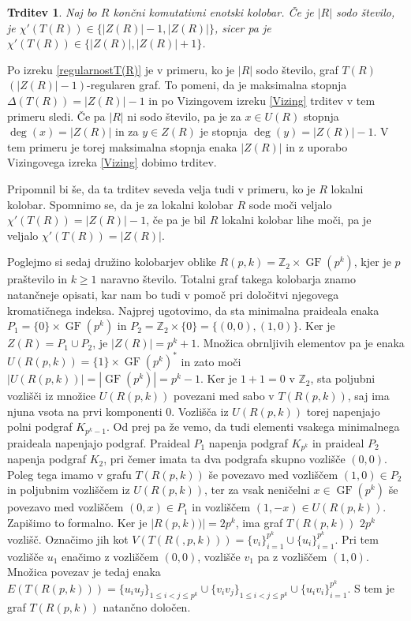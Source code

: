 \documentclass[a4paper, 12pt]{amsart}
\theoremstyle{definition} %
\theoremstyle{plain} %
\newtheorem{trditev}[definicija]{Trditev}
\newcommand{\Z}{\mathbb Z}
\DeclareMathOperator{\GF}{GF}
\begin{document}
\begin{trditev}
Naj bo $R$ končni komutativni enotski kolobar.  Če je $|R|$ sodo število, je $\chi'(T(R)) \in\{|Z(R)|-1, |Z(R)|\}$, sicer pa je $\chi'(T(R)) \in \{|Z(R)|, |Z(R)| +1\}$.
\end{trditev}

\proof
Po izreku \ref{regularnostT(R)} je v primeru, ko je $|R|$ sodo število, graf $T(R)$ $(|Z(R)| - 1)$-regularen graf. To pomeni, da je maksimalna stopnja $\Delta(T(R)) = |Z(R)|-1$ in po Vizingovem izreku \ref{Vizing} trditev v tem primeru sledi. Če pa $|R|$ ni sodo število, pa je za $x\in U(R)$ stopnja $\deg(x) = |Z(R)|$ in za $y \in Z(R)$ je stopnja $\deg(y) = |Z(R)| - 1$. V tem primeru je torej maksimalna stopnja enaka $|Z(R)|$ in z uporabo Vizingovega izreka \ref{Vizing} dobimo trditev.
\endproof

Pripomnil bi še, da ta trditev seveda velja tudi v primeru, ko je $R$ lokalni kolobar. Spomnimo se, da je za lokalni kolobar $R$ sode moči veljalo $\chi'(T(R)) = |Z(R)| -1$, če pa je bil $R$ lokalni kolobar lihe moči, pa je veljalo $\chi'(T(R)) = |Z(R)|$.

Poglejmo si sedaj družino kolobarjev oblike $R(p,k) = \Z_2 \times \GF(p^k)$, kjer je $p$ praštevilo in $k\ge1$ naravno število. Totalni graf takega kolobarja znamo natančneje opisati, kar nam bo tudi v pomoč pri določitvi njegovega kromatičnega indeksa. Najprej ugotovimo, da sta minimalna praideala enaka $P_1= \{0\} \times \GF(p^k)$ in $P_2 = \Z_2 \times \{0\} = \{(0,0),(1,0)\}$. Ker je $Z(R) = P_1 \cup P_2$, je $|Z(R)| = p^k + 1$. Množica obrnljivih elementov pa je enaka $U(R(p,k)) = \{1\} \times \GF(p^k)^*$ in zato moči $|U(R(p,k))| = |\GF(p^k)| = p^k - 1$. Ker je $1+1=0$ v $\Z_2$, sta poljubni vozlišči iz množice $U(R(p,k))$ povezani med sabo v $T(R(p,k))$, saj ima njuna vsota na prvi komponenti 0. Vozlišča iz $U(R(p,k))$ torej napenjajo polni podgraf $K_{p^k -1}$. Od prej pa že vemo, da tudi elementi vsakega minimalnega praideala napenjajo podgraf. Praideal $P_1$ napenja podgraf $K_{p^k}$ in praideal $P_2$ napenja podgraf $K_2$, pri čemer imata ta dva podgrafa skupno vozlišče $(0,0)$. Poleg tega imamo v grafu $T(R(p,k))$ še povezavo med vozliščem $(1,0)\in P_2$ in poljubnim vozliščem iz $U(R(p,k))$, ter za vsak neničelni $x\in \GF(p^k)$ še  povezavo med vozliščem $(0,x)\in P_1$ in vozliščem $(1,-x)\in U(R(p,k))$. Zapišimo to formalno. Ker je $|R(p,k))| = 2p^k$, ima graf $T(R(p,k))$ $2p^k$ vozlišč. Označimo jih kot $V(T(R(,p,k))) = \{v_i\}_{i=1}^{p^k} \cup \{u_i\}_{i=1}^{p^k}$. Pri tem vozlišče $u_1$ enačimo z vozliščem $(0,0)$, vozlišče $v_1$ pa z vozliščem $(1,0)$. Množica povezav je tedaj enaka $E(T(R(p,k))) = \{u_i u_j\}_{1\le i < j \le p^k} \cup \{v_i v_j\}_{1\le i < j \le p^k} \cup \{u_i v_i\}_{i=1}^{p^k}$. S tem je graf $T(R(p,k))$ natančno določen.
\end{document}
